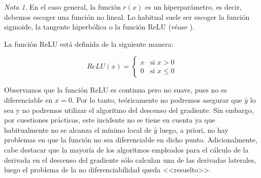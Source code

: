 \documentclass[12pt, a4paper, twoside]{book}
\numberwithin{equation}{section}
\theoremstyle{definition}
\theoremstyle{remark}
\newtheorem*{remark}{Nota}
\theoremstyle{plain}
\begin{document}
	\begin{remark}	
	En el caso general, la función $r(x)$ es un hiperparámetro, es decir,
	debemos escoger una función no lineal. Lo habitual suele ser escoger
	la función sigmoide, la tangente hiperbólica o la función ReLU (véase 
	\cite{Goodfellow-et-al-2016}).
	
	La función ReLU está definida de la siguiente manera:

	\begin{equation}
		\label{def:ReLU}
		ReLU(x)=\left \{
			\begin{array}{ll}
				x&\text{si }x>0\\
				0&\text{si }x\leq0
			\end{array} 
		     \right .
	\end{equation}
	
	Observamos que la función ReLU es continua pero no suave, pues no es 
	diferenciable en $x=0$. Por lo tanto, teóricamente no podremos 
	asegurar que $\hat{y}$ lo sea y no podremos utilizar el algoritmo del 
	descenso del gradiente. Sin embargo, por 
	cuestiones prácticas, este incidente no se tiene en cuenta ya que 
	habitualmente no se alcanza el mínimo local de $\hat{y}$ luego, a 
	priori, no hay problemas en que la función no sea diferenciable en 
	dicho punto. Adicionalmente, cabe 
	destacar que la mayoría de los algoritmos empleados para el cálculo de 
	la derivada en el descenso del gradiente sólo calculan una de las 
	derivadas laterales, luego el problema de la no diferenciabilidad 
	queda <<resuelto>>.
	\end{remark}
	
\end{document}
